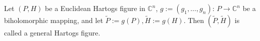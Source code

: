 Let $(P, H)$ be a Euclidean Hartogs figure in $\mathbb{C}^n$, $g := (g_1, \ldots, g_n)$: $P \rightarrow \mathbb{C}^n$ be a biholomorphic mapping, and let $\tilde{P} := g(P), \tilde{H} := g(H)$. Then $(\tilde{P}, \tilde{H})$ is called a general Hartogs figure.
